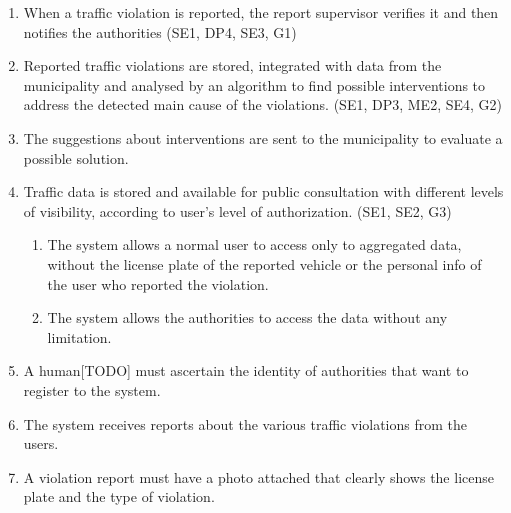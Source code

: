 \begin{enumerate}[label={R\arabic*.}]
    \item When a traffic violation is reported, the report supervisor verifies it and then notifies the authorities (SE1, DP4, SE3, G1)
    \item Reported traffic violations are stored, integrated with data from the municipality and analysed by an algorithm to find possible interventions to address the detected main cause of the violations. (SE1, DP3, ME2, SE4, G2)
    \item The suggestions about interventions are sent to the municipality to evaluate a possible solution.
    \item Traffic data is stored and available for public consultation with different levels of visibility, according to user's level of authorization. (SE1, SE2, G3)
    \begin{enumerate}[label={R\arabic{enumi}.\arabic*.}]
    	\item The system allows a normal user to access only to aggregated data, without the license plate of the reported vehicle or the personal info of the user who reported the violation.
    	\item The system allows the authorities to access the data without any limitation.
    \end{enumerate}
	\item A human[TODO] must ascertain the identity of authorities that want to register to the system.
	\item The system receives reports about the various traffic violations from the users.
	\item A violation report must have a photo attached that clearly shows the license plate and the type of violation. 
\end{enumerate}